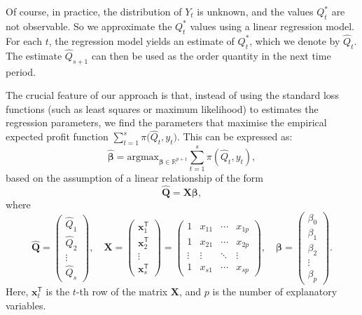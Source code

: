 \documentclass{article}
\begin{document}
Of course, in practice, the distribution of $Y_t$ is unknown, and the values $Q_t^*$ are not observable. So we approximate the $Q_t^*$ values using a linear regression model. For each $t$, the regression model yields an estimate of $Q^*_t$, which we denote by $\hat{Q}_t$. The estimate $\hat{Q}_{s+1}$ can then be used as the order quantity in the next time period.

The crucial feature of our approach is that, instead of using the standard loss functions (such as least squares or maximum likelihood) to estimates the regression parameters, we find the parameters that maximise the empirical expected profit function $\sum_{t=1}^s{\pi \big( \hat{Q}_t,y_t \big)}$. This can be expressed as:
\[
    \hat{\boldsymbol{\beta}}=\text{argmax}_{\boldsymbol{\beta}\in \mathbb{R}^{p+1}}\displaystyle\sum_{t=1}^s{\pi(\hat{Q}_t,y_t)},
\]
based on the assumption of a linear relationship of the form
\[
    \mathbf{\hat{Q}}=\mathbf{X}\boldsymbol{\beta},
\]
where
\[
    \mathbf{\hat{Q}}=
    \begin{pmatrix}
        \hat{Q}_1\\
        \hat{Q}_2\\
        \vdots\\
        \hat{Q}_s
    \end{pmatrix}, \quad
    \mathbf{X}=
    \begin{pmatrix}
        \mathbf{x}_1^{\mathsf{T}}\\
        \mathbf{x}_2^{\mathsf{T}}\\
        \vdots\\
        \mathbf{x}_s^{\mathsf{T}}
    \end{pmatrix}=
    \begin{pmatrix}
        1&x_{11}&\cdots &x_{1p}\\
        1&x_{21}&\cdots &x_{2p}\\
        \vdots &\vdots &\ddots &\vdots \\
        1&x_{s1}&\cdots &x_{sp}
    \end{pmatrix}, \quad
    \boldsymbol{\beta}=
    \begin{pmatrix}
        \beta_0\\
        \beta_1\\
        \beta_2\\
        \vdots\\
        \beta_{p}
    \end{pmatrix}.
\]
Here, $\mathbf{x}_t^{\mathsf{T}}$ is the $t$-th row of the matrix $\mathbf{X}$, and $p$ is the number of explanatory variables.
\end{document}

